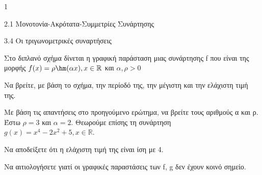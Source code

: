 \begin{center}
\end{center}
\begin{ylh}{1}
\item 2.1 Μονοτονία-Ακρότατα-Συμμετρίες Συνάρτησης
\item 3.4 Οι τριγωνομετρικές συναρτήσεις
\end{ylh}
Στο διπλανό σχήμα δίνεται η γραφική παράσταση μιας συνάρτησης f που είναι της μορφής
$f(x) = \rho\hm (\alpha x), x \in \mathbb{R}$ και $\alpha, \rho > 0$
\begin{alist}
\item Να βρείτε, με βάση το σχήμα, την περίοδό της, την μέγιστη και την ελάχιστη τιμή της.
\item Με βάση τις απαντήσεις στο προηγούμενο ερώτημα, να βρείτε τους αριθμούς α και ρ.
Έστω $\rho = 3$ και $\alpha = 2$. Θεωρούμε επίσης τη συνάρτηση $g(x) = x^4 - 2x^2 + 5, x \in \mathbb{R}$.
\item Να αποδείξετε ότι η ελάχιστη τιμή της είναι ίση με 4.
\item Να αιτιολογήσετε γιατί οι γραφικές παραστάσεις των f, g δεν έχουν κοινό σημείο.
\end{alist}

